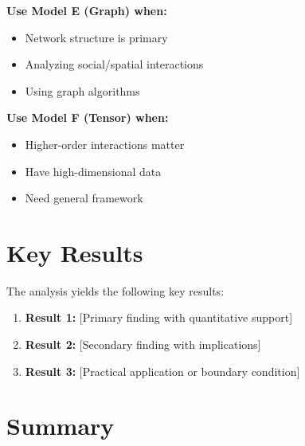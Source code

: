\begin{tcolorbox}[colback=yellow!5!white,colframe=yellow!75!black,title=\textbf{Model Selection Guide}]
\textbf{Use Model E (Graph) when:}
\begin{itemize}[noitemsep]
    \item Network structure is primary
    \item Analyzing social/spatial interactions
    \item Using graph algorithms
\end{itemize}

\textbf{Use Model F (Tensor) when:}
\begin{itemize}[noitemsep]
    \item Higher-order interactions matter
    \item Have high-dimensional data
    \item Need general framework
\end{itemize}

\end{tcolorbox}


\section{Key Results}
\label{sec:mdl-results}

The analysis yields the following key results:

\begin{enumerate}
    \item \textbf{Result 1:} [Primary finding with quantitative support]
    \item \textbf{Result 2:} [Secondary finding with implications]
    \item \textbf{Result 3:} [Practical application or boundary condition]
\end{enumerate}


\section{Summary}
\label{sec:summary}

